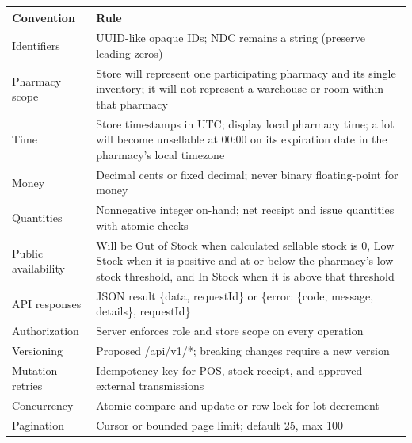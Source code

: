 {\def\LTcaptype{none} %
\begin{longtable}[]{|
  >{\raggedright\arraybackslash}m{}|
  >{\raggedright\arraybackslash}m{}|}
\hline
\begin{minipage}[c]{\linewidth}\raggedright
\textbf{Convention}
\end{minipage} & \begin{minipage}[c]{\linewidth}\raggedright
\textbf{Rule}
\end{minipage} \\
\hline
\endhead

\endlastfoot
Identifiers & UUID-like opaque IDs; NDC remains a string (preserve leading zeros) \\ \hline
Pharmacy scope & Store will represent one participating pharmacy and its single inventory; it will not represent a warehouse or room within that pharmacy \\ \hline
Time & Store timestamps in UTC; display local pharmacy time; a lot will become unsellable at 00:00 on its expiration date in the pharmacy's local timezone \\ \hline
Money & Decimal cents or fixed decimal; never binary floating-point for money \\ \hline
Quantities & Nonnegative integer on-hand; net receipt and issue quantities with atomic checks \\ \hline
Public availability & Will be Out of Stock when calculated sellable stock is 0, Low Stock when it is positive and at or below the pharmacy's low-stock threshold, and In Stock when it is above that threshold \\ \hline
API responses & JSON result \{data, requestId\} or \{error: \{code, message, details\}, requestId\} \\ \hline
Authorization & Server enforces role and store scope on every operation \\ \hline
Versioning & Proposed /api/v1/*; breaking changes require a new version \\ \hline
Mutation retries & Idempotency key for POS, stock receipt, and approved external transmissions \\ \hline
Concurrency & Atomic compare-and-update or row lock for lot decrement \\ \hline
Pagination & Cursor or bounded page limit; default 25, max 100 \\ \hline
\end{longtable}
}

